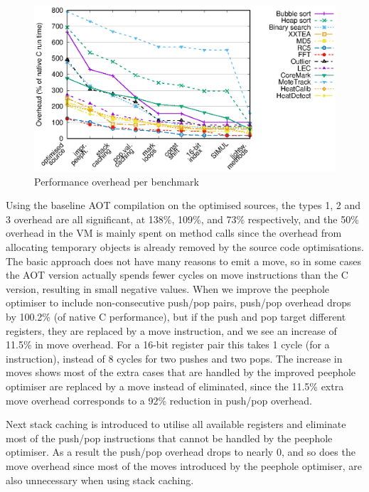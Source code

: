 \begin{figure}
\centering
\includegraphics[width=\mygraphsize]{performance-per-benchmark3a.eps}
\caption{Performance overhead per benchmark}
\label{fig-performance-per-benchmark}
\end{figure}

Using the baseline AOT compilation on the optimised sources, the types 1, 2 and 3 overhead are all significant, at 138\%,  109\%, and 73\% respectively, and the 50\% overhead in the VM is mainly spent on method calls since the overhead from allocating temporary objects is already removed by the source code optimisations. The basic approach does not have many reasons to emit a move, so in some cases the AOT version actually spends fewer cycles on move instructions than the C version, resulting in small negative values.  When we improve the peephole optimiser to include non-consecutive push/pop pairs, push/pop overhead drops by 100.2\% (of native C performance), but if the push and pop target different registers, they are replaced by a move instruction, and we see an increase of 11.5\% in move overhead. For a 16-bit register pair this takes 1 cycle (for a  instruction), instead of 8 cycles for two pushes and two pops. The increase in moves shows most of the extra cases that are handled by the improved peephole optimiser are replaced by a move instead of eliminated, since the 11.5\% extra move overhead corresponds to a 92\% reduction in push/pop overhead.

Next stack caching is introduced to utilise all available registers and eliminate most of the push/pop instructions that cannot be handled by the peephole optimiser. As a result the push/pop overhead drops to nearly 0, and so does the move overhead since most of the moves introduced by the peephole optimiser, are also unnecessary when using stack caching.

